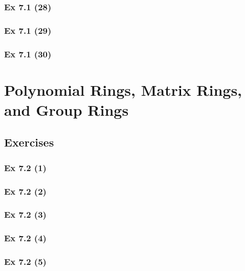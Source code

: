 \subsubsection{Ex 7.1 (28)}\label{sec:Ex_7.1.28}

\subsubsection{Ex 7.1 (29)}\label{sec:Ex_7.1.29}

\subsubsection{Ex 7.1 (30)}\label{sec:Ex_7.1.30}

\newpage		%

\section{Polynomial Rings, Matrix Rings, and Group Rings}\label{sec:7.2}	
\subsection*{Exercises}\label{sec:7.2_Exercises}

\subsubsection{Ex 7.2 (1)}\label{sec:Ex_7.2.1}

\subsubsection{Ex 7.2 (2)}\label{sec:Ex_7.2.2}

\subsubsection{Ex 7.2 (3)}\label{sec:Ex_7.2.3}

\subsubsection{Ex 7.2 (4)}\label{sec:Ex_7.2.4}

\subsubsection{Ex 7.2 (5)}\label{sec:Ex_7.2.5}

